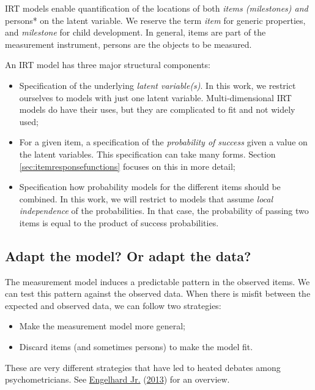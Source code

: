 \documentclass[
]{book}
\providecommand{\tightlist}{%
  \setlength{\itemsep}{0pt}\setlength{\parskip}{0pt}}
\begin{document}
IRT models enable quantification of the locations of both \emph{items (milestones) and} persons* on the latent variable. We reserve the term \emph{item} for generic properties, and \emph{milestone} for child development. In general, items are part of the measurement instrument, persons are the objects to be measured.

An IRT model has three major structural components:

\begin{itemize}
\tightlist
\item
  Specification of the underlying \emph{latent variable(s)}. In this work, we restrict ourselves to models with just one latent variable. Multi-dimensional IRT models do have their uses, but they are complicated to fit and not widely used;
\item
  For a given item, a specification of the \emph{probability of success} given a value on the latent variables. This specification can take many forms. Section \ref{sec:itemresponsefunctions} focuses on this in more detail;
\item
  Specification how probability models for the different items should be combined. In this work, we will restrict to models that assume \emph{local independence} of the probabilities. In that case, the probability of passing two items is equal to the product of success probabilities.
\end{itemize}

\hypertarget{sec:adaptmodel}{%
\subsection{Adapt the model? Or adapt the data?}\label{sec:adaptmodel}}

The measurement model induces a predictable pattern in the observed items. We can test this pattern against the observed data. When there is misfit between the expected and observed data, we can follow two strategies:

\begin{itemize}
\tightlist
\item
  Make the measurement model more general;
\item
  Discard items (and sometimes persons) to make the model fit.
\end{itemize}

These are very different strategies that have led to heated debates among psychometricians. See \protect\hyperlink{ref-engelhard2013}{Engelhard Jr.} (\protect\hyperlink{ref-engelhard2013}{2013}) for an overview.
\end{document}
